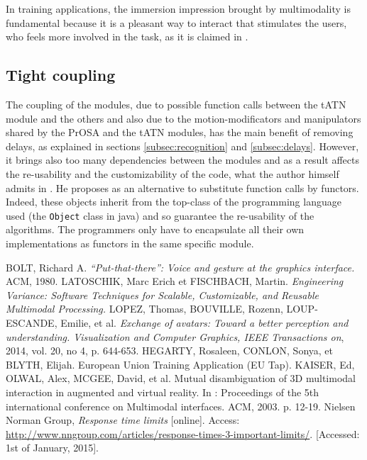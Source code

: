 \documentclass[a4paper]{article}
\begin{document}
In training applications, the immersion impression brought by multimodality is fundamental because it is a pleasant way to interact that stimulates the users, who feels more involved in the task, as it is claimed in \cite{eutap}. 

\subsection{Tight coupling}
The coupling of the modules, due to possible function calls between the tATN module and the others and also due to the motion-modificators and manipulators shared by the PrOSA and the tATN modules, has the main benefit of removing delays, as explained in sections \ref{subsec:recognition} and \ref{subsec:delays}. However, it brings also too many dependencies between the modules and as a result affects the re-usability and the customizability of the code, what the author himself admits in \cite{hcii}. He proposes as an alternative to substitute function calls by functors. Indeed, these objects inherit from the top-class of the programming language used (the \texttt{Object} class in java) and so guarantee the re-usability of the algorithms. The programmers only have to encapsulate all their own implementations as functors in the same specific module. 

\begin{thebibliography}{1}
	 BOLT, Richard A. \textit{“Put-that-there”: Voice and gesture at the graphics interface.} ACM, 1980.
	 LATOSCHIK, Marc Erich et FISCHBACH, Martin. \textit{Engineering Variance: Software Techniques for Scalable, Customizable, and Reusable Multimodal Processing.}
	 LOPEZ, Thomas, BOUVILLE, Rozenn, LOUP-ESCANDE, Emilie, et al. \textit{Exchange of avatars: Toward a better perception and understanding. Visualization and Computer Graphics, IEEE Transactions on}, 2014, vol. 20, no 4, p. 644-653.
	 HEGARTY, Rosaleen, CONLON, Sonya, et BLYTH, Elijah. European Union Training Application (EU Tap).
	 KAISER, Ed, OLWAL, Alex, MCGEE, David, et al. Mutual disambiguation of 3D multimodal interaction in augmented and virtual reality. In : Proceedings of the 5th international conference on Multimodal interfaces. ACM, 2003. p. 12-19.
	 Nielsen Norman Group, \textit{Response time limits} [online]. Access: \url{http://www.nngroup.com/articles/response-times-3-important-limits/}. [Accessed: 1st of January, 2015].
\end{thebibliography}
\end{document}
